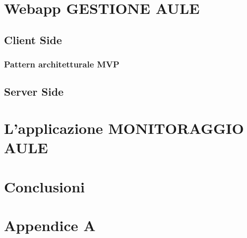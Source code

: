\documentclass[a4paper,pt11,oneside]{book}
\begin{document}
\chapter{Webapp GESTIONE AULE}

\section{Client Side}
\subsection{Pattern architetturale MVP}



\section{Server Side}


\chapter{L'applicazione MONITORAGGIO AULE}



\chapter{Conclusioni}

\chapter{Appendice A}


\end{document}
